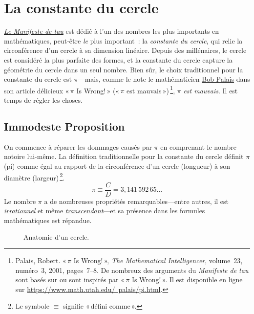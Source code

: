 \section{La constante du cercle} %
\label{sec:the_circle_constant}

\href{https://tauday.com/tau-manifesto}{\emph{Le Manifeste de tau}} est dédié à l'un des nombres les plus importants en mathématiques, peut-être \emph{le} plus important~: la \emph{constante du cercle}, qui relie la circonférence d'un cercle à sa dimension linéaire. Depuis des millénaires, le cercle est considéré la plus parfaite des formes, et la constante du cercle capture la géométrie du cercle dans un seul nombre. Bien sûr, le choix traditionnel pour la constante du cercle est $\pi$---mais, comme le note le mathématicien \href{https://www.math.utah.edu/~palais/}{Bob Palais} dans son article délicieux «\,$\pi$ Is Wrong!\,» («\,$\pi$ est mauvais\,»)\,\footnote{Palais, Robert. «\,$\pi$ Is Wrong!\,», \emph{The Mathematical Intelligencer}, volume~23, numéro~3, 2001, pages~7--8. De nombreux des arguments du \emph{Manifeste de tau} sont basés sur ou sont inspirés par «\,$\pi$ Is Wrong!\,». Il est disponible en ligne sur \href{https://www.math.utah.edu/~palais/pi.html}{https://www.math.utah.edu/~palais/pi.html}.}, $\pi$ \emph{est mauvais}. Il est temps de régler les choses.

  \subsection{Immodeste Proposition} %
  \label{sec:an_immodest_proposal}

On commence à réparer les dommages causés par $\pi$ en comprenant le nombre notoire lui-même. La définition traditionnelle pour la constante du cercle définit $\pi$ (pi) comme égal au rapport de la circonférence d'un cercle (longueur) à son diamètre (largeur)\,\footnote{Le symbole $\equiv$ signifie «\,défini comme\,».}.
\begin{equation}
\label{eq:pi}
\pi \equiv \frac{C}{D} = 3{,}141\,592\,65\ldots
\end{equation}
Le nombre $\pi$ a de nombreuses propriétés remarquables---entre autres, il est \href{https://fr.wikipedia.org/wiki/Nombre_irrationnel}{\emph{irrationnel}} et même \href{https://fr.wikipedia.org/wiki/Nombre_transcendant}{\emph{transcendant}}---et sa présence dans les formules mathématiques est répandue.

\begin{figure}
\caption{Anatomie d'un cercle.\label{fig:circle}}
\end{figure}

